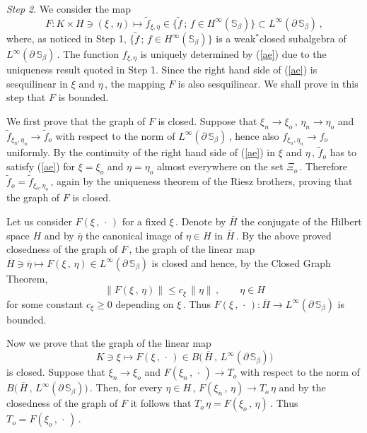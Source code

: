\documentclass[reqno]{amsart}
\theoremstyle{definition}
\theoremstyle{remark}
\numberwithin{equation}{section}
\theoremstyle{plain}
\begin{document}
{\it Step 2}. We consider the map
\begin{equation*}
F : K\times H\ni (\xi\, ,\,\eta )\longmapsto \widetilde f_{\xi ,\eta}
\in \{\widetilde f\, ;\, f\in H^\infty (\mathbb S_\beta )\}\subset
L^\infty (\partial\,\mathbb S_\beta )\, ,
\end{equation*}
where, as noticed in Step 1, $\{\widetilde f\, ;\, f\in H^\infty
(\mathbb S_\beta )\}$ is a weak${}^*$closed subalgebra of $L^\infty
(\partial\,\mathbb S_\beta )\,$. The function $f_{\xi ,\eta}$ is
uniquely determined by (\ref{ae}) due to the uniqueness result
quoted in Step 1. Since the right hand side of (\ref{ae}) is
sesquilinear in $\xi$ and $\eta\,$, the mapping $F$ is also
sesquilinear. We shall prove in this step that $F$ is bounded.

We first prove that the graph of $F$ is closed. Suppose
that  $\xi_n\longrightarrow\xi_o\,$, $\eta_n\longrightarrow\eta_o$
and $\widetilde f_{\xi_n ,\eta_n}\longrightarrow \widetilde f_o$
with respect to the norm of $L^\infty (\partial\,\mathbb S_\beta
)\,$, hence also $f_{\xi_n ,\eta_n}\longrightarrow f_o$ uniformly.
By the continuity of the right hand side of (\ref{ae}) in $\xi$
and $\eta\,$, $\widetilde f_o$ has to satisfy (\ref{ae}) for $\xi =
\xi_o$ and $\eta =\eta_o$ almost everywhere on the set $\Xi_o\,$.
Therefore $\widetilde f_o =\widetilde f_{\xi_o ,\eta_o}\,$, again
by the uniqueness theorem of the Riesz brothers, proving that
the graph of $F$ is closed.

Let us consider $F(\xi\, ,\,\cdot\, )$ for a fixed $\xi\,$. Denote
by $\overline H$ the conjugate of the Hilbert space $H$ and by
$\overline \eta$ the canonical image of $\eta\in H$ in
$\overline H\,$. By the above proved closedness of the graph of
$F\,$, the graph of the linear map ${\overline H}\ni{\overline \eta}
\longmapsto F(\xi\, ,\,\eta )\in
L^\infty (\partial\,\mathbb S_\beta )$ is closed and hence, by the
Closed Graph Theorem,
\begin{equation*}
\| F(\xi\, ,\,\eta )\|
\leq c_\xi\,\|\eta\|\, ,\qquad \eta\in H
\end{equation*}
for some constant $c_\xi\geq 0$ depending on $\xi\,$. Thus
$F(\xi\, ,\,\cdot\, ) : \overline H\longrightarrow
L^\infty (\partial\,\mathbb S_\beta )$ is bounded.

Now we prove that the graph of the linear map
\begin{equation*}
K\ni\xi\longmapsto F(\xi\, ,\,\cdot\, )\in
B\big(\, {\overline H}\, ,\,
L^\infty (\partial\,\mathbb S_\beta )\big)
\end{equation*}
is closed. Suppose that $\xi_n\longrightarrow\xi_o$ and
$F(\xi_n\, ,\,\cdot\, )\longrightarrow T_o$ with respect to the norm
of $B\big(\, {\overline H}\, ,\,
L^\infty (\partial\,\mathbb S_\beta )\big)\,$. Then, for every
$\eta\in H\,$, $F(\xi_n\, ,\,\eta )\longrightarrow T_o\,\eta$ and
by the closedness of the graph of $F$ it follows that $T_o\,\eta
= F(\xi_o\, ,\,\eta )\,$. Thus $T_o=F(\xi_o\, ,\,\cdot\, )\,$.
\end{document}
